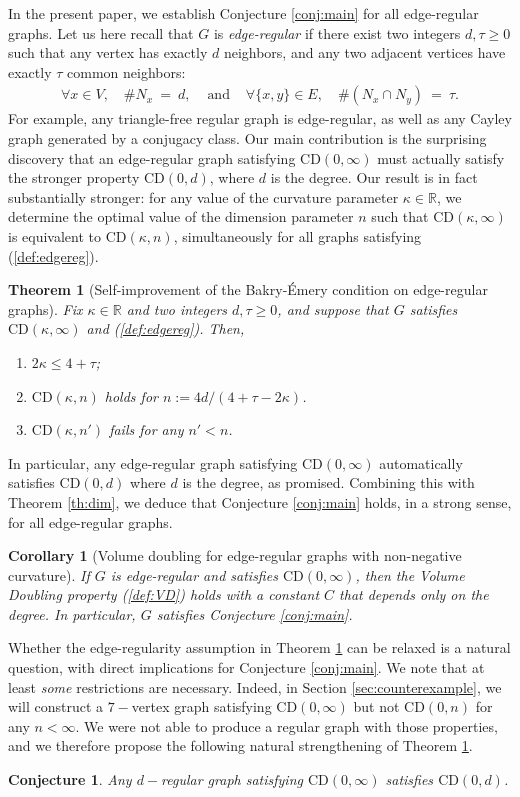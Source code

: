 \documentclass[12pt,final]{article}
\newtheorem{theorem}{Theorem}
\newtheorem{corollary}{Corollary}
\newtheorem{conjecture}{Conjecture}
\newcommand{\dR}{\mathbb {R}}
\newcommand{\CD}{\mathrm{CD}}
\begin{document}
In the present paper, we establish Conjecture \ref{conj:main} for all edge-regular graphs. Let us here recall that $G$ is \emph{edge-regular} if there exist two integers $d,\tau\ge 0$ such that any vertex has exactly $d$ neighbors, and any two adjacent vertices have exactly $\tau$ common neighbors:
\begin{eqnarray}
\label{def:edgereg}
\forall x\in V,\quad \# N_x\ =\ d, & \textrm{ and } & \forall \{x,y\}\in E,\quad  \#(N_x\cap N_y)\ =\ \tau.
\end{eqnarray}
For example, any  triangle-free regular graph is edge-regular, as well as any Cayley graph generated by a conjugacy class. Our main contribution is the surprising discovery that an edge-regular graph satisfying $\CD(0,\infty)$ must actually  satisfy the stronger property $\CD(0,d)$, where $d$ is the degree. Our result is in fact substantially stronger: for any value of the curvature parameter $\kappa\in\dR$, we determine the optimal value of the dimension parameter $n$ such that $\CD(\kappa,\infty)$ is equivalent to $\CD(\kappa,n)$, simultaneously for all graphs satisfying (\ref{def:edgereg}).
\begin{theorem}[Self-improvement of the Bakry-\'Emery condition on edge-regular graphs]\label{th:main}Fix $\kappa\in\dR$ and two integers $d,\tau\ge 0$, and suppose that $G$ satisfies $\CD(\kappa,\infty)$ and (\ref{def:edgereg}). Then, 
\begin{enumerate}
\item  $2\kappa\le 4+\tau$; 
\item $\CD(\kappa,n)$ holds for $n:=4d/(4+\tau-2\kappa)$.
\item $\CD(\kappa,n')$ fails for any $n'<n$. 
\end{enumerate}
\end{theorem}
In particular, any edge-regular graph satisfying $\CD(0,\infty)$ automatically satisfies $\CD(0,d)$ where $d$ is the degree, as promised. Combining this with Theorem \ref{th:dim}, we deduce that Conjecture \ref{conj:main} holds, in a strong sense, for all edge-regular graphs. 
\begin{corollary}[Volume doubling for edge-regular graphs with non-negative curvature]If $G$ is edge-regular and satisfies $\CD(0,\infty)$, then the Volume Doubling property (\ref{def:VD}) holds with a constant $C$ that depends only on the degree. In particular,  $G$ satisfies Conjecture \ref{conj:main}. 
\end{corollary}
Whether the edge-regularity assumption in  Theorem \ref{th:main} can be relaxed is a natural question, with direct implications for Conjecture \ref{conj:main}. We note that at least \emph{some} restrictions are necessary. Indeed, in Section \ref{sec:counterexample}, we will construct a $7-$vertex graph satisfying $\CD(0,\infty)$ but not $\CD(0,n)$ for any $n<\infty$. 
We were not able to produce a regular graph with those properties, and we therefore propose the following natural strengthening of Theorem \ref{th:main}. 
\begin{conjecture}
Any $d-$regular graph satisfying $\CD(0,\infty)$ satisfies $\CD(0,d)$.
\end{conjecture}
\end{document}
